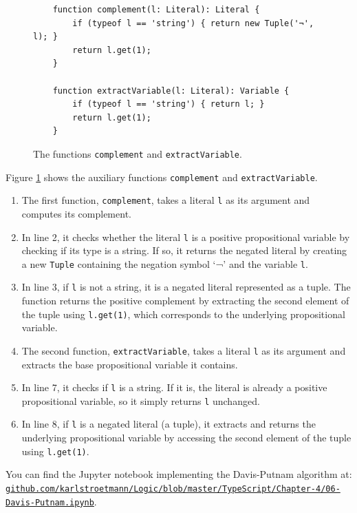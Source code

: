\begin{figure}[!ht]
  \centering
\begin{verbatim}
    function complement(l: Literal): Literal {
        if (typeof l == 'string') { return new Tuple('¬', l); } 
        return l.get(1);
    }

    function extractVariable(l: Literal): Variable {
        if (typeof l == 'string') { return l; }
        return l.get(1);
    }
  \end{verbatim}
\vspace*{-0.3cm}
  \caption{The functions \texttt{complement} and \texttt{extractVariable}.}
  \label{fig:solve-aux}
\end{figure}

Figure \ref{fig:solve-aux} shows the auxiliary functions \texttt{complement} and
\texttt{extractVariable}.
\begin{enumerate}
\item The first function, \texttt{complement}, takes a literal \texttt{l} as its argument and computes its complement.
\item In line 2, it checks whether the literal \texttt{l} is a positive propositional variable by checking if
  its type is a string. If so, it returns the negated literal by creating a new \texttt{Tuple} containing the
  negation symbol `¬' and the variable \texttt{l}. 
\item In line 3, if \texttt{l} is not a string, it is a negated literal represented as a tuple. The function
  returns the positive complement by extracting the second element of the tuple using \texttt{l.get(1)}, which
  corresponds to the underlying propositional variable. 
\item The second function, \texttt{extractVariable}, takes a literal \texttt{l} as its argument and extracts
  the base propositional variable it contains. 
\item In line 7, it checks if \texttt{l} is a string. If it is, the literal is already a positive propositional
  variable, so it simply returns \texttt{l} unchanged. 
\item In line 8, if \texttt{l} is a negated literal (a tuple), it extracts and returns the underlying
  propositional variable by accessing the second element of the tuple using \texttt{l.get(1)}. 
\end{enumerate}
You can find the Jupyter notebook implementing the Davis-Putnam algorithm at:
\\[0.2cm]
\href{https://github.com/karlstroetmann/Logic/blob/master/TypeScript/Chapter-4/06-Davis-Putnam.ipynb}{\small\texttt{github.com/karlstroetmann/Logic/blob/master/TypeScript/Chapter-4/06-Davis-Putnam.ipynb}}.


